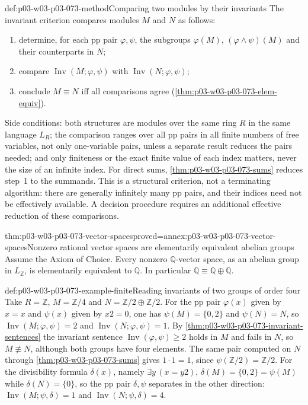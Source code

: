 \begin{hbmethod}{def:p03-w03-p03-073-method}{Comparing two modules by their invariants}
The invariant criterion compares modules \(M\) and \(N\) as follows:
\begin{enumerate}
\item determine, for each pp pair \(\varphi,\psi\), the subgroups
      \(\varphi(M)\), \((\varphi\wedge\psi)(M)\) and their counterparts
      in \(N\);
\item compare \(\operatorname{Inv}(M;\varphi,\psi)\) with
      \(\operatorname{Inv}(N;\varphi,\psi)\);
\item conclude \(M\equiv N\) iff all comparisons agree
      (\cref{thm:p03-w03-p03-073-elem-equiv}).
\end{enumerate}
Side conditions: both structures are modules over the same ring \(R\) in
the same language \(L_R\); the comparison ranges over all pp pairs in all
finite numbers of free variables, not only one-variable pairs, unless a
separate result reduces the pairs needed; and only finiteness or the exact
finite value of each index matters, never the size of an infinite index.
For direct sums, \cref{thm:p03-w03-p03-073-sums} reduces step~1 to the
summands. This is a structural criterion, not a terminating algorithm:
there are generally infinitely many pp pairs, and their indices need not
be effectively available. A decision procedure requires an additional
effective reduction of these comparisons.
\end{hbmethod}

\begin{hbcorollary}{thm:p03-w03-p03-073-vector-spaces}{proved=annex:p03-w03-p03-073-vector-spaces}{Nonzero rational vector spaces are elementarily equivalent abelian groups}
Assume the Axiom of Choice. Every nonzero \(\mathbb Q\)-vector space, as an
abelian group in \(L_{\mathbb Z}\), is elementarily equivalent to
\(\mathbb Q\). In particular \(\mathbb Q\equiv\mathbb Q\oplus\mathbb Q\).
\end{hbcorollary}

\begin{hbexample}{def:p03-w03-p03-073-example-finite}{Reading invariants of two groups of order four}
Take \(R=\mathbb Z\), \(M=\mathbb Z/4\) and
\(N=\mathbb Z/2\oplus\mathbb Z/2\). For the pp pair \(\varphi(x)\) given
by \(x=x\) and \(\psi(x)\) given by \(x2=0\), one has
\(\psi(M)=\{0,2\}\) and \(\psi(N)=N\), so
\(\operatorname{Inv}(M;\varphi,\psi)=2\) and
\(\operatorname{Inv}(N;\varphi,\psi)=1\). By
\cref{thm:p03-w03-p03-073-invariant-sentences} the invariant sentence
\(\operatorname{Inv}(\varphi,\psi)\ge2\) holds in \(M\) and fails in
\(N\), so \(M\not\equiv N\), although both groups have four elements. The
same pair computed on \(N\) through \cref{thm:p03-w03-p03-073-sums} gives
\(1\cdot1=1\), since \(\psi(\mathbb Z/2)=\mathbb Z/2\). For the
divisibility formula \(\delta(x)\), namely \(\exists y\,(x=y2)\),
\(\delta(M)=\{0,2\}=\psi(M)\) while \(\delta(N)=\{0\}\), so the pp pair
\(\delta,\psi\) separates in the other direction:
\(\operatorname{Inv}(M;\psi,\delta)=1\) and
\(\operatorname{Inv}(N;\psi,\delta)=4\).
\end{hbexample}

